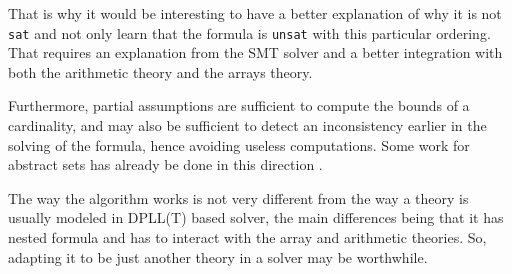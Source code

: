 \documentclass[]{article}
\begin{document}
{That is why it would be interesting to have a better explanation of why
it is not \texttt{sat} and not only learn that the formula is
\texttt{unsat} with this particular ordering. That requires an
explanation from the SMT solver and a better integration with both the
arithmetic theory and the arrays theory.

Furthermore, partial assumptions are sufficient to compute the bounds of
a cardinality, and may also be sufficient to detect an inconsistency
earlier in the solving of the formula, hence avoiding useless
computations. Some work for abstract sets has already be done in this
direction \cite{cardinalityset}.

The way the algorithm works is not very different from the way a theory
is usually modeled in DPLL(T) based solver, the main differences being
that it has nested formula and has to interact with the array and
arithmetic theories. So, adapting it to be just another theory in a
solver may be worthwhile.

}{}

\newpage


\end{document}
